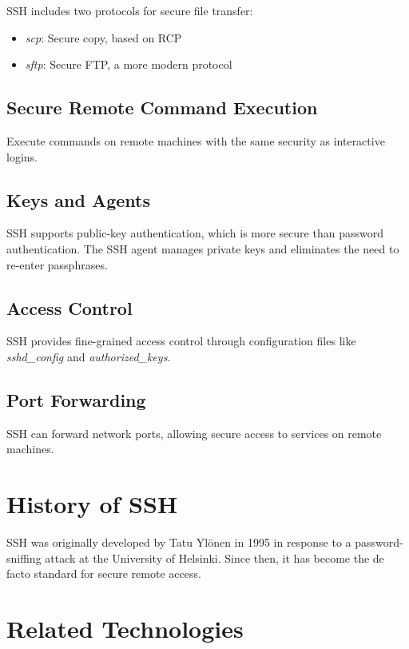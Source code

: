 \documentclass[12pt]{book}
\begin{document}
SSH includes two protocols for secure file transfer:
\begin{itemize}
    \item \textit{scp}: Secure copy, based on RCP
    \item \textit{sftp}: Secure FTP, a more modern protocol
\end{itemize}

\subsection{Secure Remote Command Execution}

Execute commands on remote machines with the same security as interactive logins.

\subsection{Keys and Agents}

SSH supports public-key authentication, which is more secure than password authentication. The SSH agent manages private keys and eliminates the need to re-enter passphrases.

\subsection{Access Control}

SSH provides fine-grained access control through configuration files like \textit{sshd\_config} and \textit{authorized\_keys}.

\subsection{Port Forwarding}

SSH can forward network ports, allowing secure access to services on remote machines.

\section{History of SSH}

SSH was originally developed by Tatu Ylönen in 1995 in response to a password-sniffing attack at the University of Helsinki. Since then, it has become the de facto standard for secure remote access.

\section{Related Technologies}
\end{document}
